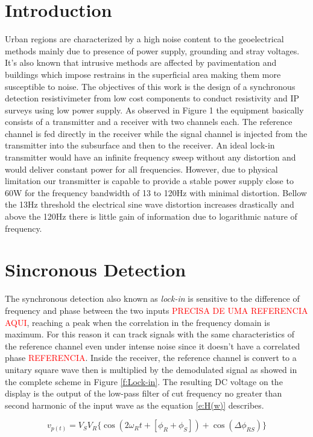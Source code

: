 \documentclass{vie16}
\newcommand{\att}[1]{\textcolor{red}{#1}}
\begin{document}
\section{Introduction}
Urban regions are characterized by a high noise content to the
geoelectrical methods mainly due to presence of power supply,
grounding and stray voltages. It's also known that intrusive methods
are affected by pavimentation and buildings which impose restrains in
the superficial area making them more susceptible to noise. The
objectives of this work is the design of a synchronous detection
resistivimeter from low cost components to conduct resistivity and IP
surveys using low power supply.  As observed in Figure 1 the equipment
basically consists of a transmitter and a receiver with two channels
each. The reference channel is fed directly in the receiver while the
signal channel is injected from the transmitter into the subsurface
and then to the receiver. An ideal lock-in transmitter would have an
infinite frequency sweep without any distortion and would deliver
constant power for all frequencies. However, due to physical
limitation our transmitter is capable to provide a stable power supply
close to 60W for the frequency bandwidth of 13 to 120Hz with minimal
distortion.  Bellow the 13Hz threshold the electrical sine wave
distortion increases drastically and above the 120Hz there is little
gain of information due to logarithmic nature of frequency.

\section{Sincronous Detection}
The synchronous detection also known as \textit{lock-in} is sensitive
to the difference of frequency and phase between the two inputs
\att{PRECISA DE UMA REFERENCIA AQUI}, reaching a peak when the
correlation in the frequency domain is maximum. For this reason it can
track signals with the same characteristics of the reference channel
even under intense noise since it doesn't have a correlated
phase \att{REFERENCIA}. Inside the receiver, the reference channel is
convert to a unitary square wave then is multiplied by the demodulated
signal as showed in the complete scheme in Figure \ref{f:Lock-in}. The
resulting DC voltage on the display is the output of the low-pass
filter of cut frequency no greater than second harmonic of the input wave
 as the equation \ref{e:H(w)} describes.

\begin{equation}
	v_{p(t)} = V_{S}V_{R}\lbrace \cos( 2\omega_{R} t + [\phi_{R} + \phi_{S}] )
					     				+ \cos( \Delta\phi_{RS})  
					     \rbrace
	\label{e:H(w)}
\end{equation}
  
\end{document}

